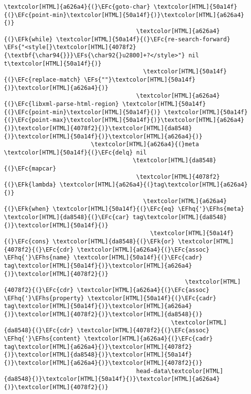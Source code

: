 \documentclass{scrartcl}
\newcommand{\EFk}[1]{\textcolor{EFk}{#1}} %
\newcommand{\EFs}[1]{\textcolor{EFs}{#1}} %
\newcommand{\EFc}[1]{\textcolor{EFc}{#1}} %
\newcommand{\EFhq}[1]{\textcolor{EFhq}{#1}} %
\newcommand{\EFhs}[1]{\textcolor{EFhs}{#1}} %
\begin{document}
\begin{Code}
\begin{Verbatim}[]
                                      \textcolor[HTML]{a626a4}{(}\EFc{goto-char} \textcolor[HTML]{50a14f}{(}\EFc{point-min}\textcolor[HTML]{50a14f}{)}\textcolor[HTML]{a626a4}{)}
                                      \textcolor[HTML]{a626a4}{(}\EFk{while} \textcolor[HTML]{50a14f}{(}\EFc{re-search-forward} \EFs{"<style[}\textcolor[HTML]{4078f2}{\textbf{\char94{}}}\EFs{\char92{}u2800]+?</style>"} nil t\textcolor[HTML]{50a14f}{)}
                                        \textcolor[HTML]{50a14f}{(}\EFc{replace-match} \EFs{""}\textcolor[HTML]{50a14f}{)}\textcolor[HTML]{a626a4}{)}
                                      \textcolor[HTML]{a626a4}{(}\EFc{libxml-parse-html-region} \textcolor[HTML]{50a14f}{(}\EFc{point-min}\textcolor[HTML]{50a14f}{)} \textcolor[HTML]{50a14f}{(}\EFc{point-max}\textcolor[HTML]{50a14f}{)}\textcolor[HTML]{a626a4}{)}\textcolor[HTML]{4078f2}{)}\textcolor[HTML]{da8548}{)}\textcolor[HTML]{50a14f}{)}\textcolor[HTML]{a626a4}{)}
                         \textcolor[HTML]{a626a4}{(}meta \textcolor[HTML]{50a14f}{(}\EFc{delq} nil
                                     \textcolor[HTML]{da8548}{(}\EFc{mapcar}
                                      \textcolor[HTML]{4078f2}{(}\EFk{lambda} \textcolor[HTML]{a626a4}{(}tag\textcolor[HTML]{a626a4}{)}
                                        \textcolor[HTML]{a626a4}{(}\EFk{when} \textcolor[HTML]{50a14f}{(}\EFc{eq} \EFhq{'}\EFhs{meta} \textcolor[HTML]{da8548}{(}\EFc{car} tag\textcolor[HTML]{da8548}{)}\textcolor[HTML]{50a14f}{)}
                                          \textcolor[HTML]{50a14f}{(}\EFc{cons} \textcolor[HTML]{da8548}{(}\EFk{or} \textcolor[HTML]{4078f2}{(}\EFc{cdr} \textcolor[HTML]{a626a4}{(}\EFc{assoc} \EFhq{'}\EFhs{name} \textcolor[HTML]{50a14f}{(}\EFc{cadr} tag\textcolor[HTML]{50a14f}{)}\textcolor[HTML]{a626a4}{)}\textcolor[HTML]{4078f2}{)}
                                                    \textcolor[HTML]{4078f2}{(}\EFc{cdr} \textcolor[HTML]{a626a4}{(}\EFc{assoc} \EFhq{'}\EFhs{property} \textcolor[HTML]{50a14f}{(}\EFc{cadr} tag\textcolor[HTML]{50a14f}{)}\textcolor[HTML]{a626a4}{)}\textcolor[HTML]{4078f2}{)}\textcolor[HTML]{da8548}{)}
                                                \textcolor[HTML]{da8548}{(}\EFc{cdr} \textcolor[HTML]{4078f2}{(}\EFc{assoc} \EFhq{'}\EFhs{content} \textcolor[HTML]{a626a4}{(}\EFc{cadr} tag\textcolor[HTML]{a626a4}{)}\textcolor[HTML]{4078f2}{)}\textcolor[HTML]{da8548}{)}\textcolor[HTML]{50a14f}{)}\textcolor[HTML]{a626a4}{)}\textcolor[HTML]{4078f2}{)}
                                      head-data\textcolor[HTML]{da8548}{)}\textcolor[HTML]{50a14f}{)}\textcolor[HTML]{a626a4}{)}\textcolor[HTML]{4078f2}{)}

\end{Verbatim}
\end{Code}
\end{document}
